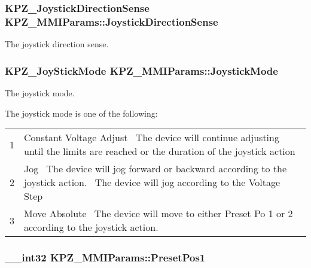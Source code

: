 \subsubsection[{\texorpdfstring{Joystick\+Direction\+Sense}{JoystickDirectionSense}}]{\setlength{\rightskip}{0pt plus 5cm}K\+P\+Z\+\_\+\+Joystick\+Direction\+Sense K\+P\+Z\+\_\+\+M\+M\+I\+Params\+::\+Joystick\+Direction\+Sense}\hypertarget{struct_k_p_z___m_m_i_params_a486d44e6de44a642cf8a7a8982421835}{}\label{struct_k_p_z___m_m_i_params_a486d44e6de44a642cf8a7a8982421835}


The joystick direction sense. 

\subsubsection[{\texorpdfstring{Joystick\+Mode}{JoystickMode}}]{\setlength{\rightskip}{0pt plus 5cm}K\+P\+Z\+\_\+\+Joy\+Stick\+Mode K\+P\+Z\+\_\+\+M\+M\+I\+Params\+::\+Joystick\+Mode}\hypertarget{struct_k_p_z___m_m_i_params_a985db5a3f457d8583670660ce8d25cd8}{}\label{struct_k_p_z___m_m_i_params_a985db5a3f457d8583670660ce8d25cd8}


The joystick mode. 

The joystick mode is one of the following\+: \tabulinesep=1mm
\begin{longtabu} spread 0pt [c]{*2{|X[-1]}|}
&Constant Voltage Adjust~\newline
The device will continue adjusting until the limits are reached or the duration of the joystick action \\
2&Jog~\newline
The device will jog forward or backward according to the joystick action.~\newline
 The device will jog according to the Voltage Step \\
3&Move Absolute~\newline
The device will move to either Preset Po 1 or 2 according to the joystick action. \\
\end{longtabu}
\subsubsection[{\texorpdfstring{Preset\+Pos1}{PresetPos1}}]{\setlength{\rightskip}{0pt plus 5cm}\+\_\+\+\_\+int32 K\+P\+Z\+\_\+\+M\+M\+I\+Params\+::\+Preset\+Pos1}\hypertarget{struct_k_p_z___m_m_i_params_a15fbb7a3f8ffe52584a1b485cc9859c0}{}\label{struct_k_p_z___m_m_i_params_a15fbb7a3f8ffe52584a1b485cc9859c0}


